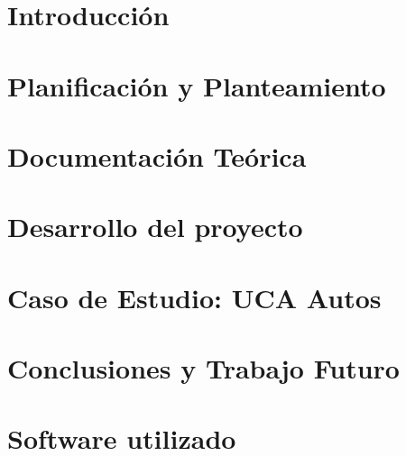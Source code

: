 \documentclass[a4paper,11pt]{book}
\begin{document}
\renewcommand{\listfigurename}{Indice de figuras}
\renewcommand{\tablename}{Tabla}
\renewcommand{\listtablename}{Indice de tablas}


\pagestyle{empty}

\cleardoublepage


\cleardoublepage
\pagestyle{plain}

\frontmatter %


\cleardoublepage

\tableofcontents
\listoffigures

\mainmatter %

\chapter{Introducción}


\chapter{Planificación y Planteamiento}


\chapter{Documentación Teórica}\label{cap:wiki}


\chapter{Desarrollo del proyecto}


\chapter{Caso de Estudio: UCA Autos}





\chapter{Conclusiones y Trabajo Futuro}


\backmatter %

\cleardoublepage

\chapter{Software utilizado}

\end{document}
